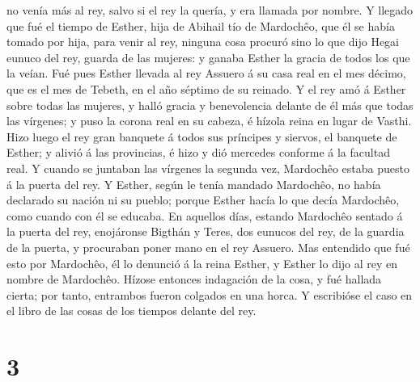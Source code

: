 no venía más al rey, salvo si el rey la quería, y era llamada por
nombre.  Y llegado que fué el tiempo de Esther, hija de
Abihail tío de Mardochêo, que él se había tomado por hija, para venir al
rey, ninguna cosa procuró sino lo que dijo Hegai eunuco del rey, guarda
de las mujeres: y ganaba Esther la gracia de todos los que la veían.
 Fué pues Esther llevada al rey Assuero á su casa real en
el mes décimo, que es el mes de Tebeth, en el año séptimo de su reinado.
 Y el rey amó á Esther sobre todas las mujeres, y halló
gracia y benevolencia delante de él más que todas las vírgenes; y puso
la corona real en su cabeza, é hízola reina en lugar de Vasthi.
 Hizo luego el rey gran banquete á todos sus príncipes y
siervos, el banquete de Esther; y alivió á las provincias, é hizo y dió
mercedes conforme á la facultad real.  Y cuando se juntaban
las vírgenes la segunda vez, Mardochêo estaba puesto á la puerta del
rey.  Y Esther, según le tenía mandado Mardochêo, no había
declarado su nación ni su pueblo; porque Esther hacía lo que decía
Mardochêo, como cuando con él se educaba.  En aquellos
días, estando Mardochêo sentado á la puerta del rey, enojáronse Bigthán
y Teres, dos eunucos del rey, de la guardia de la puerta, y procuraban
poner mano en el rey Assuero.  Mas entendido que fué esto
por Mardochêo, él lo denunció á la reina Esther, y Esther lo dijo al rey
en nombre de Mardochêo.  Hízose entonces indagación de la
cosa, y fué hallada cierta; por tanto, entrambos fueron colgados en una
horca. Y escribióse el caso en el libro de las cosas de los tiempos
delante del rey.

\hypertarget{section-2}{%
\section{3}\label{section-2}}


